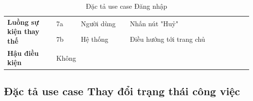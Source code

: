 \documentclass[../DoAn.tex]{subfiles}
\begin{document}
\begin{table}[ht]
\begin{tabular}{| p{0.2\linewidth} | p{0.1\linewidth} | p{0.2\linewidth} | p{0.5\linewidth} |}
        \multirow{2}{\linewidth}{\textbf{Luồng sự kiện thay thế}}    & \multicolumn{1}{p{0.1\linewidth}|}{7a}                                                            & \multicolumn{1}{p{0.2\linewidth}|}{Người dùng}             & \multicolumn{1}{p{0.5\linewidth}|}{Nhấn nút "Huỷ"}                                                                         \\ \cline{2-4}
                                                                     & \multicolumn{1}{p{0.1\linewidth}|}{7b}                                                            & \multicolumn{1}{p{0.2\linewidth}|}{Hệ thống}               & \multicolumn{1}{p{0.5\linewidth}|}{Điều hướng tới trang chủ}                                                               \\ \hline
        \textbf{Hậu điều kiện}                                       & \multicolumn{3}{p{0.1\linewidth}|}{Không}                                                                                                                                                                                                                                                   \\ \hline
    \end{tabular}%
    \renewcommand{\arraystretch}{1}
    \caption{Đặc tả use case Đăng nhập}
    \label{tab:UC02}
\end{table}

\newpage

\subsection{Đặc tả use case Thay đổi trạng thái công việc}
\label{subsection:2.3.3}
\end{document}
